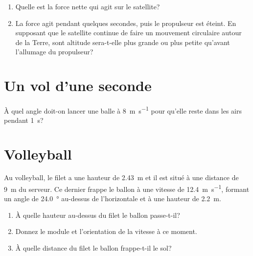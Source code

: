 \documentclass[nofonts]{tufte-handout}
\begin{document}
\begin{enumerate}[label=\alph*)]
  \item Quelle est la force nette qui agit sur le satellite?
  \item La force agit pendant quelques secondes, puis le propulseur est éteint.
    En supposant que le satellite continue de faire un mouvement circulaire
    autour de la Terre, sont altitude sera-t-elle plus grande ou plus petite
    qu'avant l'allumage du propulseur?
\end{enumerate}


\section{Un vol d'une seconde}
À quel angle doit-on lancer une balle à \qty{8}{\meter\per\second} pour qu'elle
reste dans les airs pendant \qty{1}{\second}?


\section{Volleyball}
Au volleyball, le filet a une hauteur de \qty{2.43}{\meter} et il est situé à
une distance de \qty{9}{\meter} du serveur. Ce dernier frappe le ballon à une
vitesse de \qty{12.4}{\meter\per\second}, formant un angle de
\qty{24.0}{\degree} au-dessus de l'horizontale et à une hauteur de
\qty{2.2}{\meter}.
\begin{enumerate}[label=\alph*)]
  \item À quelle hauteur au-dessus du filet le ballon passe-t-il?
  \item Donnez le module et l'orientation de la vitesse à ce moment.
  \item À quelle distance du filet le ballon frappe-t-il le sol?
\end{enumerate}
\end{document}

